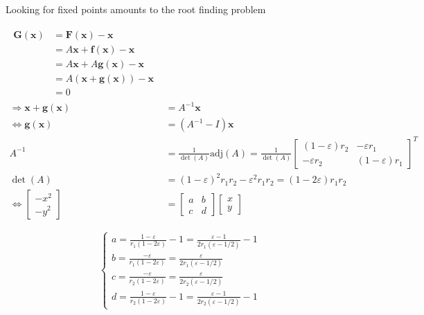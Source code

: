 Looking for fixed points amounts to the root finding problem

\begin{align}
	\begin{split}
	\symbf{G}(\symbf{x}) &= \symbf{F}(\symbf{x}) - \symbf{x} \\ 
						 &= A \symbf{x} +\symbf{f}(\symbf{x}) - \symbf{x}\\
						 &= A \symbf{x} + A \symbf{g}(\symbf{x}) -\symbf{x}\\
						 &= A(\symbf{x} + \symbf{g}(\symbf{x})) - \symbf{x} \\
						 &= 0
	\end{split}\\
	\Rightarrow \symbf{x} + \symbf{g}(\symbf{x}) &= A^{-1}\symbf{x}\\
	\iff \symbf{g}(\symbf{x}) &= (A^{-1} - I)\symbf{x}\\
	A^{-1} &= \frac{1}{\det(A)}{\textrm{adj}}(A) =
	\frac{1}{\det(A)}
	\begin{bmatrix}
		(1-\varepsilon)r_2 & -\varepsilon r_1\\
		-\varepsilon r_2 & (1-\varepsilon) r_1
	\end{bmatrix}^T
	\label{eq:singularityeq}
	\\
	\det(A) &= (1-\varepsilon)^2 r_1 r_2 - \varepsilon^2 r_1 r_2 = (1 - 2\varepsilon)r_1 r_2 
	\\
	\iff 
	\begin{bmatrix}
		-x^2\\
		-y^2
	\end{bmatrix}
	&=
	\begin{bmatrix}
		a & b\\
		c & d
	\end{bmatrix}
	\begin{bmatrix}
		x\\
		y
	\end{bmatrix}
\end{align}

\begin{equation}
	\begin{cases}
		a = \frac{1-\varepsilon}{r_1(1-2\varepsilon)}-1 = \frac{\varepsilon - 1}{2r_1(\varepsilon - 1/2)}-1\\
		b = \frac{-\varepsilon}{r_1(1-2\varepsilon)} = \frac{\varepsilon}{2r_1(\varepsilon - 1/2)}\\
		c = \frac{-\varepsilon}{r_2(1-2\varepsilon)} = \frac{\varepsilon}{2r_2(\varepsilon - 1/2)}\\
		d = \frac{1-\varepsilon}{r_2(1-2\varepsilon)} -1 = \frac{\varepsilon - 1}{2r_2(\varepsilon - 1/2)}-1
	\end{cases}
	\label{eq:system-help-vars}
\end{equation}

